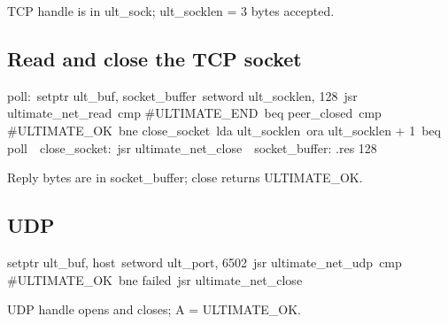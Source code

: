 \begin{resultbox}
TCP handle is in ult_sock; ult_socklen = 3 bytes accepted.
\end{resultbox}

\subsection*{Read and close the TCP socket}

\begin{listingbox}
poll:\
\hspace*{2em}setptr ult\_buf, socket\_buffer\
\hspace*{2em}setword ult\_socklen, 128\
\hspace*{2em}jsr ultimate\_net\_read\
\hspace*{2em}cmp \#ULTIMATE\_END\
\hspace*{2em}beq peer\_closed\
\hspace*{2em}cmp \#ULTIMATE\_OK\
\hspace*{2em}bne close\_socket\
\hspace*{2em}lda ult\_socklen\
\hspace*{2em}ora ult\_socklen + 1\
\hspace*{2em}beq poll\
\
close\_socket:\
\hspace*{2em}jsr ultimate\_net\_close\
\
socket\_buffer: .res 128
\end{listingbox}

\begin{resultbox}
Reply bytes are in socket_buffer; close returns ULTIMATE_OK.
\end{resultbox}

\Needspace{14\baselineskip}
\subsection*{UDP}

\begin{listingbox}
\hspace*{2em}setptr ult\_buf, host\
\hspace*{2em}setword ult\_port, 6502\
\hspace*{2em}jsr ultimate\_net\_udp\
\hspace*{2em}cmp \#ULTIMATE\_OK\
\hspace*{2em}bne failed\
\hspace*{2em}jsr ultimate\_net\_close
\end{listingbox}

\begin{resultbox}
UDP handle opens and closes; A = ULTIMATE_OK.
\end{resultbox}

